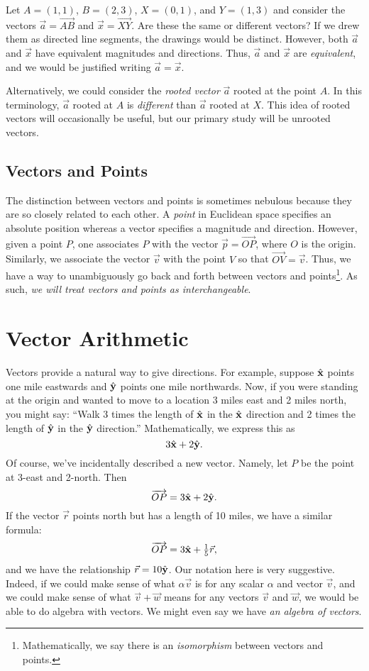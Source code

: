 Let $A=(1,1)$, $B=(2,3)$, $X=(0,1)$, and $Y=(1,3)$ and consider the vectors
$\vec a = \overrightarrow{AB}$ and $\vec x=\overrightarrow{XY}$.  Are these
the same or different vectors?  If we drew them as directed line segments,
the drawings would be distinct.  However, both $\vec a$ and $\vec x$ have equivalent
magnitudes and directions.  Thus, $\vec a$ and $\vec x$ are \emph{equivalent},
and we would be justified writing $\vec a=\vec x$.

Alternatively, we could consider the \emph{rooted vector}
$\vec a$ rooted at the point $A$.  In this terminology, $\vec a$ rooted
at $A$ is \emph{different} than $\vec a$ rooted at $X$.  This idea
of rooted vectors will occasionally be useful, but our primary study will be unrooted
vectors.

\subsection{Vectors and Points}
The distinction between vectors and points is sometimes nebulous because
they are so closely related to each other.  A \emph{point}
in Euclidean space specifies an absolute position whereas a vector
specifies a magnitude and direction.  However, given a point $P$,
one associates $P$ with the vector $\vec p=\overrightarrow{OP}$, where $O$
is the origin.  Similarly, we associate the vector $\vec v$ with
the point $V$ so that $\overrightarrow{OV}=\vec v$.
Thus, we have a way to unambiguously go back and forth between vectors and 
points\footnote{ Mathematically, we say there is an \emph{isomorphism} between
vectors and points.}.  As such, \emph{we will treat vectors and points
as interchangeable}.


\section{Vector Arithmetic}
Vectors provide a natural way to give directions.
For example, suppose ${\hat {\mathbf x}}$ points one mile eastwards and ${\hat {\mathbf y}}$
points one mile northwards.  Now, if you were standing at the origin
and wanted to move to a location 3 miles east and 2 miles north, you might say:
``Walk 3 times the length of ${\hat {\mathbf x}}$  in the ${\hat {\mathbf x}}$ direction and 2 times
the length of ${\hat {\mathbf y}}$ in the ${\hat {\mathbf y}}$ direction.''  Mathematically, we express this
as
\[
	3{\hat {\mathbf x}}+2{\hat {\mathbf y}}.
\]
Of course, we've incidentally described a new vector.  Namely, let $P$
be the point at 3-east and 2-north.  Then
\[
	\overrightarrow{OP}=3{\hat {\mathbf x}}+2{\hat {\mathbf y}}.
\]
If the vector $\vec r$ points north but has a length of 10 miles, we have
a similar formula:
\[
	\overrightarrow{OP}=3{\hat {\mathbf x}}+\tfrac{1}{5}\vec r,
\]
and we have the relationship $\vec r=10{\hat {\mathbf y}}$.
Our notation here is very suggestive.  Indeed, if we could make
sense of what $\alpha\vec v$ is for any scalar $\alpha$ and vector
$\vec v$, and we could make sense of what $\vec v+\vec w$
means for any vectors $\vec v$ and $\vec w$, we would be able to
do algebra with vectors.  We might even say we have \emph{an algebra
of vectors}.

